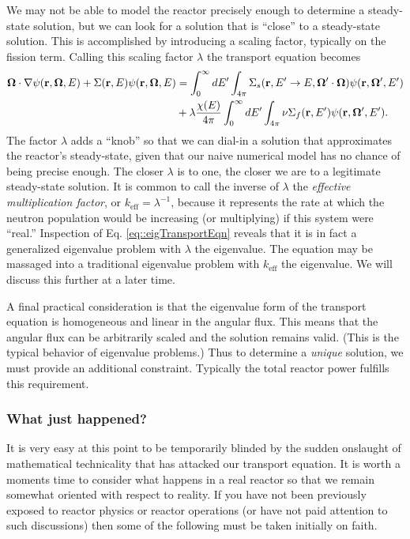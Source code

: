 \documentclass[11pt]{article}
\renewcommand\vec{\mathbf}
\begin{document}
We may not be able to model the reactor precisely enough to determine a steady-state solution, but we can look for a solution that is ``close'' to a steady-state solution.  This is accomplished by introducing a scaling factor, typically on the fission term.  Calling this scaling factor \(\lambda\) the transport equation becomes
\begin{align}
  \vec{\Omega} \cdot \nabla\psi(\vec{r},\vec{\Omega},E)
  + \Sigma(\vec{r},E) \psi(\vec{r},\vec{\Omega},E)
  &= \int_0^\infty dE' \int_{4\pi} \Sigma_s(\vec{r},E' \rightarrow E, \vec{\Omega}'\cdot\vec{\Omega}) \psi(\vec{r},\vec{\Omega}',E') \notag\\
  &+ \lambda\frac{\chi(E)}{4\pi} \int_0^\infty dE' \int_{4\pi} \nu\Sigma_f(\vec{r},E') \psi(\vec{r},\vec{\Omega}',E').
  \label{eq::eigTransportEqn}
\end{align}
The factor \(\lambda\) adds a ``knob'' so that we can dial-in a solution that approximates the reactor's steady-state, given that our naive numerical model has no chance of being precise enough.  The closer \(\lambda\) is to one, the closer we are to a legitimate steady-state solution.  It is common to call the inverse of \(\lambda\) the \emph{effective multiplication factor}, or \(k_\text{eff} = \lambda^{-1}\), because it represents the rate at which the neutron population would be increasing (or multiplying) if this system were ``real.''  Inspection of Eq. \eqref{eq::eigTransportEqn} reveals that it is in fact a generalized eigenvalue problem with \(\lambda\) the eigenvalue.  The equation may be massaged into a traditional eigenvalue problem with \(k_\text{eff}\) the eigenvalue.  We will discuss this further at a later time.

A final practical consideration is that the eigenvalue form of the transport equation is homogeneous and linear in the angular flux.  This means that the angular flux can be arbitrarily scaled and the solution remains valid.  (This is the typical behavior of eigenvalue problems.)  Thus to determine a \emph{unique} solution, we must provide an additional constraint.  Typically the total reactor power fulfills this requirement.

\subsubsection{What just happened?}
\label{sec:orgheadline49}
It is very easy at this point to be temporarily blinded by the sudden onslaught of mathematical technicality that has attacked our transport equation.  It is worth a moments time to consider what happens in a real reactor so that we remain somewhat oriented with respect to reality.  If you have not been previously exposed to reactor physics or reactor operations (or have not paid attention to such discussions) then some of the following must be taken initially on faith.
\end{document}
